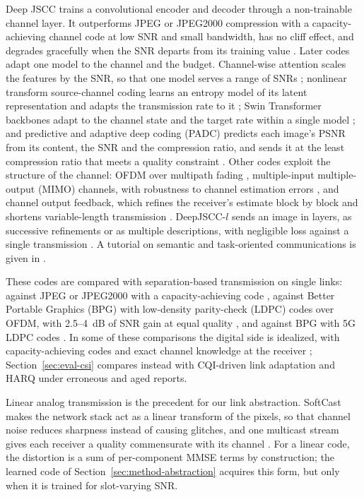 Deep JSCC trains a convolutional encoder and decoder through a non-trainable channel layer. It
outperforms JPEG or JPEG2000 compression with a capacity-achieving channel code at low SNR and
small bandwidth, has no cliff effect, and degrades gracefully when the SNR departs from its
training value \cite{Bourtsoulatze19}. Later codes adapt one model to the channel and the budget.
Channel-wise attention scales the features by the SNR, so that one model serves a range of SNRs
\cite{Xu22}; nonlinear transform source-channel coding learns an entropy model of its latent
representation and adapts the transmission rate to it \cite{Dai22}; Swin Transformer backbones
adapt to the channel state and the target rate within a single model \cite{Yang25}; and
predictive and adaptive deep coding (PADC) predicts each image's PSNR from its content, the SNR
and the compression ratio, and sends it at the least compression ratio that meets a quality
constraint \cite{Zhang23}. Other codes exploit the structure of the channel: OFDM over multipath
fading \cite{YangBianKim22}, multiple-input multiple-output (MIMO) channels, with robustness to
channel estimation errors \cite{Wu24m}, and channel output feedback, which refines the receiver's
estimate block by block and shortens variable-length transmission \cite{Kurka20,Wu24f}.
DeepJSCC-$l$ sends an image in layers, as successive refinements or as multiple descriptions,
with negligible loss against a single transmission \cite{Kurka21}. A tutorial on semantic and
task-oriented communications is given in \cite{Gunduz23}.

These codes are compared with separation-based transmission on single links: against JPEG or JPEG2000 with a
capacity-achieving code \cite{Bourtsoulatze19}, against Better Portable Graphics (BPG) with
low-density parity-check (LDPC) codes over OFDM, with 2.5--4~dB of SNR gain at equal quality
\cite{YangBianKim22}, and against BPG with 5G LDPC codes \cite{Yang25}. In some of these
comparisons the digital side is idealized, with capacity-achieving codes and exact channel
knowledge at the receiver \cite{Bourtsoulatze19,Kurka20}; Section~\ref{sec:eval-csi} compares
instead with CQI-driven link adaptation and HARQ under erroneous and aged reports.

Linear analog transmission is the precedent for our link abstraction. SoftCast makes the network stack
act as a linear transform of the pixels, so that channel noise reduces sharpness instead of
causing glitches, and one multicast stream gives each receiver a quality commensurate with its
channel \cite{Jakubczak11}. For a linear code, the distortion is a sum of per-component MMSE
terms by construction; the learned code of Section~\ref{sec:method-abstraction} acquires this
form, but only when it is trained for slot-varying SNR.

